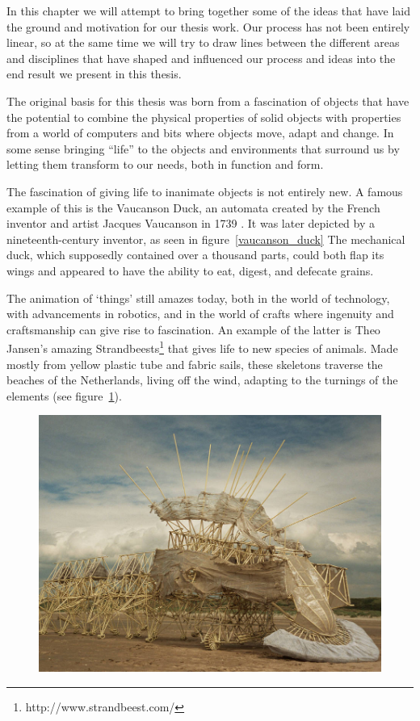 In this chapter we will attempt to bring together some of the ideas that have laid the ground and motivation for our thesis work.
Our process has not been entirely linear, so at the same time we will try to draw lines between the different areas and disciplines that have shaped and influenced our process and ideas into the end result we present in this thesis.  

The original basis for this thesis was born from a fascination of objects that have the potential to combine the physical properties of solid objects with properties from a world of computers and bits where objects move, adapt and change. 
In some sense bringing ``life'' to the objects and environments that surround us by letting them transform to our needs, both in function and form. 

The fascination of giving life to inanimate objects is not entirely new.
A famous example of this is the Vaucanson Duck, an automata created by the French inventor and artist Jacques Vaucanson in 1739 \citep{riskin2003defecating}.
It was later depicted by a nineteenth-century inventor, as seen in figure~\ref{vaucanson_duck} 
The mechanical duck, which supposedly contained over a thousand parts, could both flap its wings and appeared to have the ability to eat, digest, and defecate grains.

The animation of `things' still amazes today, both in the world of technology, with advancements in robotics, and in the world of crafts where ingenuity and craftsmanship can give rise to fascination.   
An example of the latter is Theo Jansen's amazing Strandbeests\footnote{http://www.strandbeest.com/} that gives life to new species of animals.
Made mostly from yellow plastic tube and fabric sails, these skeletons traverse the beaches of the Netherlands, living off the wind, adapting to the turnings of the elements (see figure~\ref{strandbeest}).

\begin{figure}[h]
	\centering
	\includegraphics[width=0.9\linewidth]{figures/strandbeest}
   	\label{strandbeest}
\end{figure}

